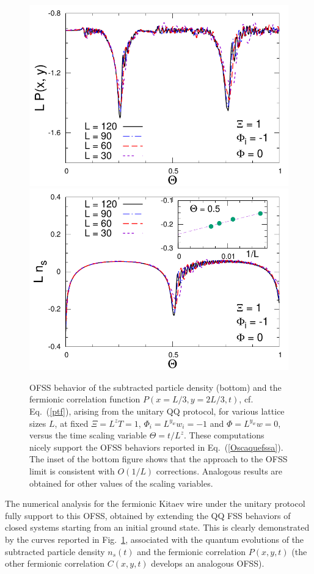 \begin{figure}[!htb]
\centering
  \includegraphics[width=0.6\columnwidth]{imm/LPk-1q0e100g0.pdf}
  \includegraphics[width=0.6\columnwidth]{imm/LNk-1q0e100g0.pdf}
  \caption{OFSS behavior of the subtracted particle density (bottom)
    and the fermionic correlation function $P(x=L/3,y=2L/3,t)$,
    cf. Eq.~(\ref{ptf}), arising from the unitary QQ protocol, for
    various lattice sizes $L$, at fixed $\Xi=L^z T =1$,
    $\Phi_i=L^{y_w} w_i=-1$ and $\Phi=L^{y_w} w=0$, versus the time
    scaling variable $\Theta=t/L^z$.  These computations nicely
    support the OFSS behaviors reported in
    Eq.~(\ref{Oscaquefssa}). The inset of the bottom figure shows that
    the approach to the OFSS limit is consistent with $O(1/L)$
    corrections.  Analogous results are obtained for other values of
    the scaling variables.}
  \label{protares}
\end{figure}


The numerical analysis for the fermionic Kitaev wire under the unitary
protocol fully support to this OFSS, obtained by extending the QQ FSS
behaviors of closed systems starting from an initial ground
state. This is clearly demonstrated by the curves reported in
Fig.~\ref{protares}, associated with the quantum evolutions of the
subtracted particle density $n_s(t)$ and the fermionic correlation
$P(x,y,t)$ (the other fermionic correlation $C(x,y,t)$ develops an
analogous OFSS).



